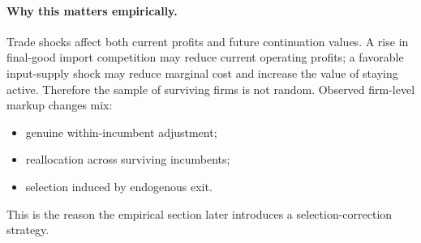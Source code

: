 \paragraph{Why this matters empirically.}
Trade shocks affect both current profits and future continuation values. A rise in final-good import competition may reduce current operating profits; a favorable input-supply shock may reduce marginal cost and increase the value of staying active. Therefore the sample of surviving firms is not random. Observed firm-level markup changes mix:
\begin{itemize}
    \item genuine within-incumbent adjustment;
    \item reallocation across surviving incumbents;
    \item selection induced by endogenous exit.
\end{itemize}
This is the reason the empirical section later introduces a selection-correction strategy.
